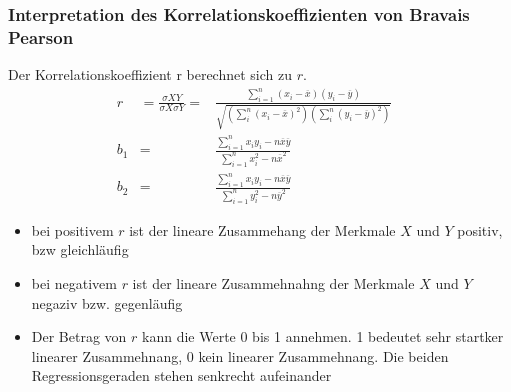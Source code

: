 \subsubsection{Interpretation des Korrelationskoeffizienten von Bravais Pearson}
Der Korrelationskoeffizient r berechnet sich zu $r$.
\begin{align}
r&=\frac{\sigma XY}{\sigma X \sigma Y} =& \frac{\sum_{i=1}^n\left(x_i-\overline{x} \right )\left(y_i - \overline{y} \right )}{\sqrt{\left(\sum_i^n\left(x_i - \overline{x}\right)^2 \right )\left(\sum_i^n\left(y_i - \overline{y} \right )^2 \right )}}\\
b_1 &=& \frac{\sum_{i=1}^n x_i y_i - n\overline{x}\overline{y}}{\sum_{i=1}^n x_i^2 - n\overline{x}^2}&\\
b_2 &=& \frac{\sum_{i=1}^n x_i y_i - n\overline{x}\overline{y}}{\sum_{i=1}^n y_i^2 - n\overline{y}^2}&
\end{align}
\begin{itemize}
\item bei positivem $r$ ist der lineare Zusammehang der Merkmale $X$ und $Y$ positiv, bzw gleichläufig
\item bei negativem $r$ ist der lineare Zusammehnahng der Merkmale $X$ und $Y$ negaziv bzw. gegenläufig
\item Der Betrag von $r$ kann die Werte 0 bis 1 annehmen. 1 bedeutet sehr startker linearer Zusammehnang, 0 kein linearer Zusammehnang. Die beiden Regressionsgeraden stehen senkrecht aufeinander
\end{itemize}
